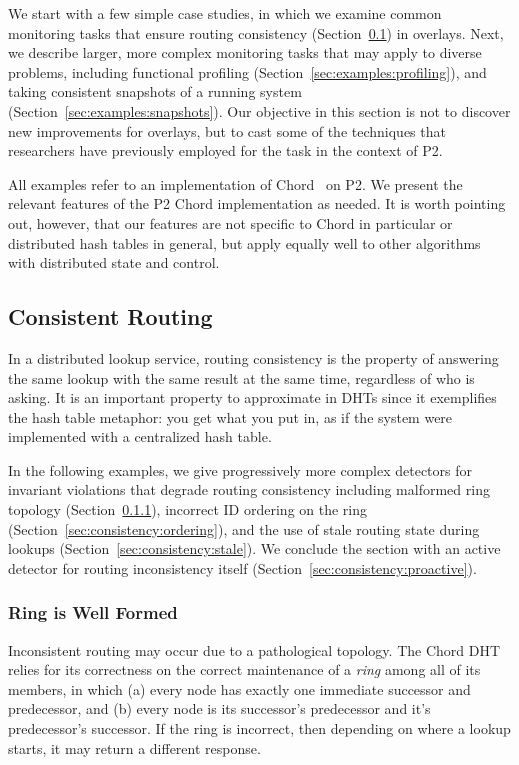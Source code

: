 \documentclass{sig-alt-full}
\begin{document}
We start with a few simple case studies, in which we examine common
monitoring tasks  that ensure routing consistency
(Section~\ref{sec:examples:consistency}) in overlays.  Next, we describe larger, more
complex monitoring tasks that may apply to diverse problems, including
functional profiling (Section~\ref{sec:examples:profiling}), and taking
consistent snapshots of a running system
(Section~\ref{sec:examples:snapshots}).  Our objective in this
section is not to discover new improvements for
overlays, but to cast some of the techniques that
researchers have 
previously employed for the task in the context of P2.

All examples refer to an implementation of Chord~\cite{Stoica2003} on
P2. We present the relevant features of the P2 Chord implementation as
needed.  It is worth pointing out, however, that our features are not
specific to Chord in particular or distributed hash tables in general,
but apply equally well to other algorithms with distributed state and control.


\subsection{Consistent Routing}
\label{sec:examples:consistency}

In a distributed lookup service, routing consistency is the property of
answering the same lookup with the same result at the same time,
regardless of who is asking. It is an important property to approximate
in DHTs since it exemplifies the hash table metaphor: you get what you
put in, as if the system were implemented with a centralized hash table.

In the following examples, we give progressively more
complex detectors for invariant violations that degrade
routing consistency including malformed ring topology
(Section~\ref{sec:consistency:ring}), incorrect ID ordering
on the ring (Section~\ref{sec:consistency:ordering}), and the
use of stale routing state during lookups
(Section~\ref{sec:consistency:stale}).  We conclude the
section with an active detector for routing
inconsistency itself
(Section~\ref{sec:consistency:proactive}).




\subsubsection{Ring is Well Formed}
\label{sec:consistency:ring}
Inconsistent routing may occur due to a pathological topology.
The Chord DHT relies for its correctness on the correct maintenance of a
\emph{ring} among all of its members, in which (a) every node has
exactly one immediate successor and predecessor, and (b) every node is
its successor's predecessor and it's predecessor's successor.  If the
ring is incorrect, then depending on where a lookup starts, it may
return a different response.
\end{document}
